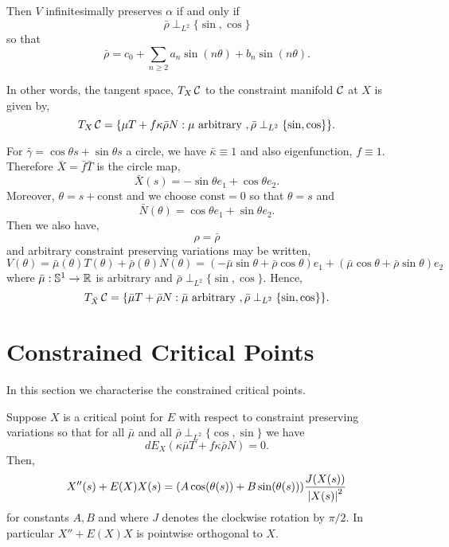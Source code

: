 \documentclass[12pt]{article}
\begin{document}
Then \(V\) infinitesimally preserves \(\alpha\) if and only if
\[
\bar{\rho} \perp_{L^2} \{\sin, \cos\}
\]
so that
\[
\bar{\rho} = c_0 + \sum_{n\geq 2} a_n \sin(n \theta) + b_n \sin(n \theta).
\]

In other words, the tangent space, \(T_X \operatorname{\mathcal{C}}\) to the constraint manifold \(\operatorname{\mathcal{C}}\) at \(X\) is given by,
\[
T_X \operatorname{\mathcal{C}} = \{\mu T + f\kappa\bar{\rho} N : \mu \text{ arbitrary }, \bar{\rho} \perp_{L^2} \{\sin, \cos\}\}.
\]

For \(\bar{\gamma} = \cos\theta s + \sin \theta s\) a circle, we have \(\bar{\kappa} \equiv 1\) and also eigenfunction, \(f \equiv 1\). Therefore \(\bar{X} = \bar{f} \bar{T}\) is the circle map,
\[
\bar{X}(s) = -\sin\theta e_1 + \cos\theta e_2.
\]
Moreover, \(\theta = s + \text{const}\) and we choose \(\text{const} = 0\) so that \(\theta = s\) and
\[
\bar{N}(\theta) = \cos\theta e_1 + \sin\theta e_2.
\]
Then we also have,
\[
\rho = \bar{\rho}
\]
and arbitrary constraint preserving variations may be written,
\[
V(\theta) = \bar{\mu}(\theta) T(\theta) + \bar{\rho}(\theta) N(\theta) = (- \bar{\mu}\sin\theta + \bar{\rho} \cos\theta) e_1 + (\bar{\mu}\cos\theta + \bar{\rho}\sin\theta) e_2
\]
where \(\bar{\mu} : \operatorname{\mathbb{S}^1} \to \operatorname{\mathbb{R}}\) is arbitrary and \(\bar{\rho} \perp_{L^2} \{\sin, \cos\}\). Hence,
\[
T_{\bar{X}} \operatorname{\mathcal{C}} = \{\bar{\mu} T + \bar{\rho} N : \bar{\mu} \text{ arbitrary }, \bar{\rho} \perp_{L^2} \{\sin, \cos\}\}.
\]

\section{Constrained Critical Points}

In this section we characterise the constrained critical points.

\begin{thm}
Suppose \(X\) is a critical point for \(E\) with respect to constraint preserving variations so that for all \(\bar{\mu}\) and all \(\bar{\rho} \perp_{L^2} \{\cos, \sin\}\) we have
\[
dE_X(\kappa\bar{\mu} T + f\kappa \bar{\rho} N) = 0.
\]
Then,
\[
X''(s) + E(X) X(s) = (A \cos(\theta(s)) + B \sin(\theta(s))) \frac{J(X(s))}{\left|{X(s)}\right|^2}
\]
for constants \(A, B\) and where \(J\) denotes the clockwise rotation by \(\pi/2\). In particular \(X'' + E(X) X\) is pointwise orthogonal to \(X\).
\end{thm}
\end{document}
